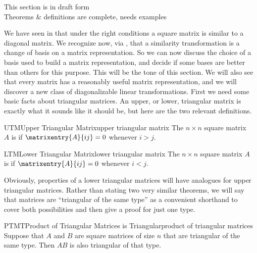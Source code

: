 %
{\sc\large This section is in draft form}\\
{\sc\large Theorems \& definitions are complete, needs examples}
\par\medskip
%
%
We have seen in  that under the right conditions a square matrix is similar to a diagonal matrix.  We recognize now, via , that a similarity transformation is a change of basis on a matrix representation.  So we can now discuss the choice of a basis used to build a matrix representation, and decide if some bases are better than others for this purpose.  This will be the tone of this section.  We will also see that every matrix has a reasonably useful matrix representation, and we will discover a new class of diagonalizable linear transformations.  First we need some basic facts about triangular matrices.
%
%
An upper, or lower, triangular matrix is exactly what it sounds like it should be, but here are the two relevant definitions.
%
\begin{definition}{UTM}{Upper Triangular Matrix}{upper triangular matrix}
The $n\times n$ square matrix $A$ is  if $\matrixentry{A}{ij} =0$ whenever $i>j$.
\end{definition}
%
%
\begin{definition}{LTM}{Lower Triangular Matrix}{lower triangular matrix}
The $n\times n$ square matrix $A$ is  if $\matrixentry{A}{ij} =0$ whenever $i<j$.
\end{definition}
%
Obviously, properties of a lower triangular matrices will have analogues for upper triangular matrices.  Rather than stating two very similar theorems, we will say that matrices are ``triangular of the same type'' as a convenient shorthand to cover both possibilities and then give a proof for just one type.
%
\begin{theorem}{PTMT}{Product of Triangular Matrices is Triangular}{product of triangular matrices}
Suppose that $A$ and $B$ are square matrices of size $n$ that are triangular of the same type.  Then $AB$ is also triangular of that type.
\end{theorem}
